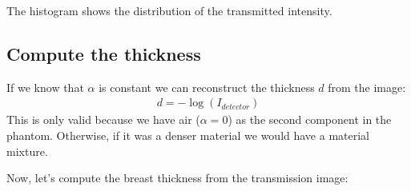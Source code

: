 \documentclass[letterpaper,10pt,english]{sphinxmanual}
\begin{document}
\noindent{}

\sphinxAtStartPar
The histogram shows the distribution of the transmitted intensity.


\subsection{Compute the thickness}
\label{\detokenize{04-BasicSegmentation:compute-the-thickness}}
\sphinxAtStartPar
If we know that \(\alpha\) is constant we can reconstruct the thickness \(d\) from the image:
\begin{equation*}
\begin{split} d = -\log(I_{detector})\end{split}
\end{equation*}
\sphinxAtStartPar
This is only valid because we have air (\(\alpha=0\)) as the second component in the phantom. Otherwise, if it was a denser material we would have a material mixture.

\sphinxAtStartPar
Now, let’s compute the breast thickness from the transmission image:

\begin{sphinxVerbatim}[commandchars=\\\{\}]
  
         

      

   
\end{sphinxVerbatim}
\end{document}
